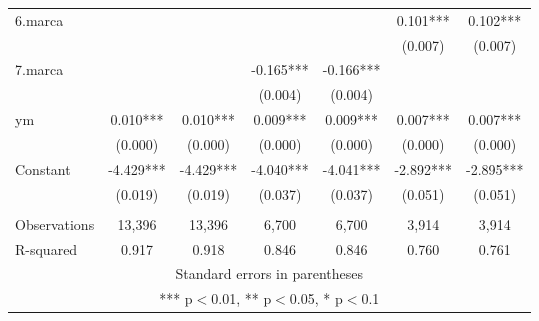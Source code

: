 \begin{longtable}{lcccccc}
6.marca &  &  &  &  & 0.101*** & 0.102*** \\
&  &  &  &  & (0.007) & (0.007) \\
7.marca &  &  & -0.165*** & -0.166*** &  &  \\
&  &  & (0.004) & (0.004) &  &  \\
ym & 0.010*** & 0.010*** & 0.009*** & 0.009*** & 0.007*** & 0.007*** \\
 & (0.000) & (0.000) & (0.000) & (0.000) & (0.000) & (0.000) \\
Constant & -4.429*** & -4.429*** & -4.040*** & -4.041*** & -2.892*** & -2.895*** \\
 & (0.019) & (0.019) & (0.037) & (0.037) & (0.051) & (0.051) \\
 &  &  &  &  &  &  \\
Observations & 13,396 & 13,396 & 6,700 & 6,700 & 3,914 & 3,914 \\
 R-squared & 0.917 & 0.918 & 0.846 & 0.846 & 0.760 & 0.761 \\ \hline
\multicolumn{7}{c}{ Standard errors in parentheses} \\
\multicolumn{7}{c}{ *** p$<$0.01, ** p$<$0.05, * p$<$0.1} \\
\end{longtable}
